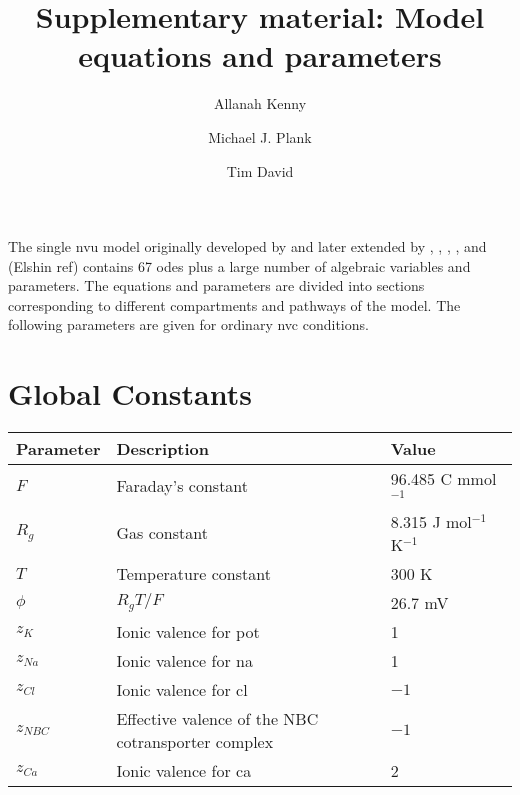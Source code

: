 \documentclass[11pt]{elsarticle}
\newcommand{\JmolK}{J mol$^{-1}$ K$^{-1}$\xspace}
\newcommand{\n}{$^{-1}$\xspace}
\newcommand{\na}{\gls{na}\xspace}
\newcommand{\pot}{\gls{pot}\xspace}
\newcommand{\cl}{\gls{cl}\xspace}
\newcommand{\ca}{\gls{ca}\xspace}
\begin{document}
\begin{frontmatter}
	
	\title{\vspace{-2cm}Supplementary material: Model equations and parameters}
	
	
	\author[1]{Allanah Kenny}
	\author[2]{Michael J. Plank}
	\author[1]{Tim David}
	
	\address[1]{High Performance Computing Centre, University of Canterbury, New Zealand}
	\address[2]{Department of Mathematics and Statistics, University of Canterbury, New Zealand}
	
\end{frontmatter}

The single \gls{nvu} model originally developed by \citet{Farr2011} and later extended by \citet{Dormanns2015}, \citet{Dormanns2016}, \citet{Mathias2017}, \citet{Kenny2018}, and (Elshin ref) contains 67 \glspl{ode} plus a large number of algebraic variables and parameters. The equations and parameters are divided into sections corresponding to different compartments and pathways of the model.
The following parameters are given for ordinary \gls{nvc} conditions.

\section{Global Constants}
\begin{longtable}[h!]{ p{0.12\linewidth}   p{0.6\linewidth}   p{0.28\linewidth} }
	\hline
	Parameter & Description & Value \\
	\hline

$F$			& Faraday's constant 	& 96.485 C mmol\n				\\
$R_g$ 			& Gas constant 				& 8.315 \JmolK	 \\
$T$ 	    	& Temperature constant								& 300 K	\\
$\phi$ 		& $R_g T / F$				& 26.7 mV \\		
$z_K$			& Ionic valence for \pot 										& 1   \\ 
$z_{Na}$			& Ionic valence for \na 											& 1   \\ 
$z_{Cl}$			& Ionic valence for \cl 											& $-1$  \\ 
$z_{NBC}$ 		& Effective valence of the NBC cotransporter complex 				& $-1$ \\
$z_{Ca}$  & Ionic valence for \ca & 2 \\
	\hline
\end{longtable}
\end{document}
